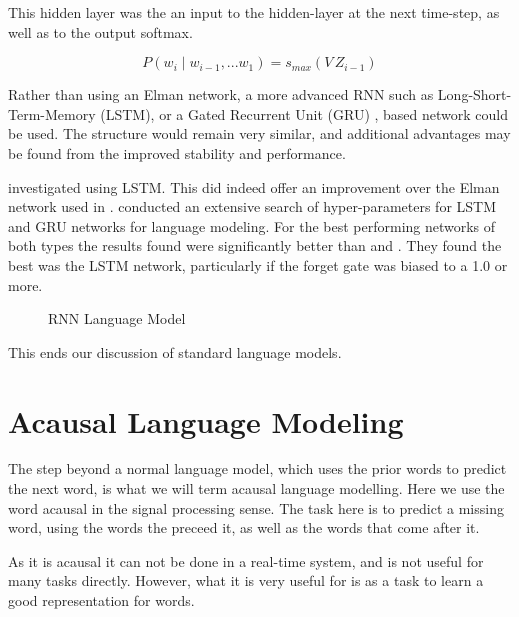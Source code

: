 \documentclass[parskip]{komatufte}
\begin{document}
This hidden layer was the an input to the hidden-layer at the next time-step, as well as to the output softmax.

\begin{equation}
	P(w_i \mid w_{i-1}, ... w_{1}) = s_{max}\left(V \, Z_{i-1} \right)
\end{equation}



Rather than using an Elman network, a more advanced RNN such as Long-Short-Term-Memory (LSTM), or a Gated Recurrent Unit (GRU) , based network could be used.
The structure would remain very similar,
and additional advantages may be found from the improved stability and performance.

 investigated using LSTM.
This did indeed offer an improvement over the Elman network used in \textcite{mikolov2010recurrent}.
 conducted an extensive search of hyper-parameters for LSTM and GRU networks for language modeling.
For the best performing networks of both types the results found were significantly better than \textcite{sundermeyer2012lstm} and \textcite{mikolov2010recurrent}.
They found the best was the LSTM network, particularly if the forget gate was biased to a 1.0 or more.

\begin{figure}
	\centering
	 
	\caption{\label{fig:neural-language-model} RNN Language Model}
\end{figure}

This ends our discussion of standard language models.


\section{Acausal Language Modeling}
The step beyond a normal language model,
which uses the prior words to predict the next word,
is what we will term acausal language modelling.
Here we use the word acausal in the signal processing sense.
The task here is to predict a missing word, using the words the preceed it, as well as the words that come after it.

As it is acausal it can not be done in a real-time system, and is not useful for many tasks directly.
However, what it is very useful for is as a task to learn a good representation for words.
\end{document}
